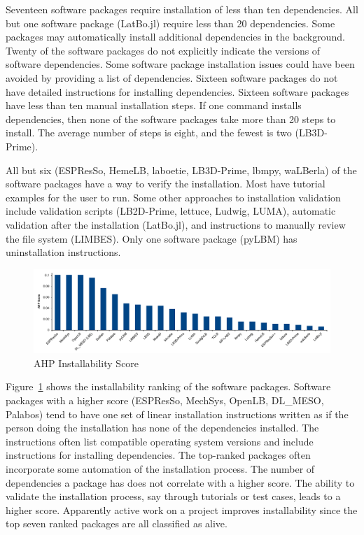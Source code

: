 \documentclass[final, 3p, times, authoryear]{elsarticle}
\begin{document}
Seventeen software packages require installation of less than ten dependencies.
All but one software package (LatBo.jl) require less than 20 dependencies. Some
packages may automatically install additional dependencies in the background.
Twenty of the software packages do not explicitly indicate the versions of
software dependencies. Some software package installation issues could have been
avoided by providing a list of dependencies. Sixteen software packages do not
have detailed instructions for installing dependencies. Sixteen software
packages have less than ten manual installation steps. If one command installs
dependencies, then none of the software packages take more than 20 steps to
install. The average number of steps is eight, and the fewest is two
(LB3D-Prime).

All but six (ESPResSo, HemeLB, laboetie, LB3D-Prime, lbmpy, waLBerla) of the
software packages have a way to verify the installation. Most have tutorial
examples for the user to run. Some other approaches to installation validation
include validation scripts (LB2D-Prime, lettuce, Ludwig, LUMA), automatic
validation after the installation (LatBo.jl), and instructions to manually
review the file system (LIMBES). Only one software package (pyLBM) has
uninstallation instructions.

\begin{figure}[h!]
	\begin{center}
		\includegraphics[width=1.0\textwidth]{./figures/installability_chart.pdf}
		\caption{AHP Installability Score}
		\label{Fig_Installability}
	\end{center}
\end{figure}

Figure~\ref{Fig_Installability} shows the installability ranking of the software
packages. Software packages with a higher score (ESPResSo, MechSys, OpenLB,
DL\_MESO, Palabos) tend to have one set of linear installation instructions
written as if the person doing the installation has none of the dependencies
installed. The instructions often list compatible operating system versions and
include instructions for installing dependencies. The top-ranked packages often
incorporate some automation of the installation process. The number of
dependencies a package has does not correlate with a higher score. The ability
to validate the installation process, say through tutorials or test cases, leads
to a higher score. Apparently active work on a project improves installability
since the top seven ranked packages are all classified as alive. 
 
\end{document}
